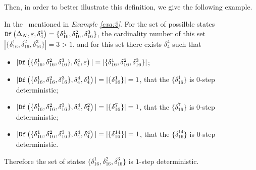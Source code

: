  Then, in order to better illustrate this definition, we give the following example.
\begin{example}
In the \BCN\ mentioned in {\em Example \ref{exa:2}}. For the set of possilble states ${\tt Df}\left(\Delta_N,\varepsilon,\delta_4^1\right)=\{\delta_{16}^1,\delta_{16}^2,\delta_{16}^3\}$, the cardinality number of this set $|\{\delta_{16}^1,\delta_{16}^2,\delta_{16}^3\}|=3>1$, and for this set there exists $\delta_{4}^4$ such that 
 \begin{itemize}
 \item  $|{\tt Df}\left(\{\delta_{16}^1,\delta_{16}^2,\delta_{16}^3\},\delta_{4}^4,\varepsilon\right)|=|\{\delta_{16}^1,\delta_{16}^2,\delta_{16}^3\}|$;
 \item  $|{\tt Df}\left(\{\delta_{16}^1,\delta_{16}^2,\delta_{16}^3\},\delta_{4}^4,\delta_{4}^1\right)|=|\{\delta_{16}^1\}|=1$, that the $\{\delta_{16}^1\}$ is $0$-step deterministic;
 \item  $|{\tt Df}\left(\{\delta_{16}^1,\delta_{16}^2,\delta_{16}^3\},\delta_{4}^4,\delta_{4}^2\right)|=|\{\delta_{16}^7\}|=1$, that the $\{\delta_{16}^7\}$ is $0$-step deterministic;
  \item  $|{\tt Df}\left(\{\delta_{16}^1,\delta_{16}^2,\delta_{16}^3\},\delta_{4}^4,\delta_{4}^4\right)|=|\{\delta_{16}^{14}\}|=1$, that the $\{\delta_{16}^{14}\}$ is $0$-step deterministic.
 \end{itemize}
 Therefore the set of states $\{\delta_{16}^1,\delta_{16}^2,\delta_{16}^3\}$ is $1$-step deterministic.
\label{exa:9}
\end{example}  

